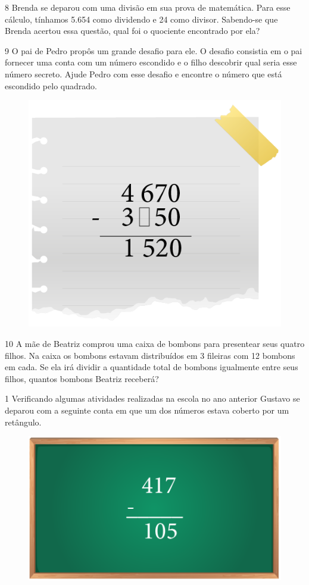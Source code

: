 \bigskip
\bigskip
\bigskip
\bigskip
\bigskip

\num{8} Brenda se deparou com uma divisão em sua prova de matemática. Para
esse cálculo, tínhamos 5.654 como dividendo e 24 como divisor. Sabendo-se
que Brenda acertou essa questão, qual foi o quociente encontrado por ela?


\pagebreak

\num{9} O pai de Pedro propôs um grande desafio para ele. O desafio
consistia em o pai fornecer uma conta com um número escondido e o filho descobrir qual seria esse número secreto. Ajude Pedro com esse
desafio e encontre o número que está escondido pelo quadrado.

\begin{figure}[htpb!]
\centering
\includegraphics[width=.4\textwidth]{../ilustracoes/MAT5/SAEB_5ANO_MAT_figura21.png}
\end{figure}


\bigskip
\bigskip
\bigskip
\bigskip

\num{10} A mãe de Beatriz comprou uma caixa de bombons para presentear seus
quatro filhos. Na caixa os bombons estavam distribuídos em 3 fileiras
com 12 bombons em cada. Se ela irá dividir a quantidade total de bombons
igualmente entre seus filhos, quantos bombons Beatriz receberá?


\pagebreak


\num{1} Verificando algumas atividades realizadas na escola no ano anterior
Gustavo se deparou com a seguinte conta em que um dos números estava
coberto por um retângulo.

\begin{figure}[htpb!]
\centering
\includegraphics[width=.5\textwidth]{../ilustracoes/MAT5/SAEB_5ANO_MAT_figura22.png}
\end{figure}

